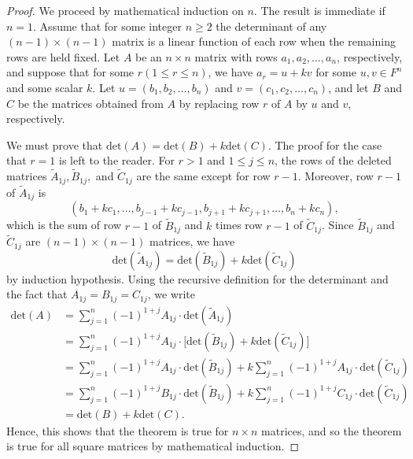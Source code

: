 \begin{proof}
We proceed by mathematical induction on \( n  \). The result is immediate if \( n = 1  \). Assume that for some integer \( n \geq 2  \) the determinant of any \( (n-1) \times (n-1) \) matrix is a linear function of each row when the remaining rows are held fixed. Let \( A  \) be an \( n \times n  \) matrix with rows \( {a}_{1}, {a}_{2}, \dots, {a}_{n} \), respectively, and suppose that for some \( r (1 \leq r \leq n) \), we have \( {a}_{r} = u + kv  \) for some \( u,v \in F^{n} \) and some scalar \( k  \). Let \( u = ({b}_{1}, {b}_{2}, \dots, {b}_{n}) \) and \( v = ({c}_{1}, {c}_{2}, \dots, {c}_{n}) \), and let \( B  \) and \( C \) be the matrices obtained from \( A  \) by replacing row \( r  \) of \( A  \) by \( u \) and \( v  \), respectively.

We must prove that \( \text{det}(A) = \text{det}(B) + k \text{det}(C) \). The proof for the case that \( r = 1  \) is left to the reader. For \( r > 1  \) and \( 1 \leq j \leq  n \), the rows of the deleted matrices \( {\tilde{A}}_{1j}, {\tilde{B}}_{1j},  \) and \( {\tilde{C}}_{1j} \) are the same except for row \( r - 1  \). Moreover, row \( r - 1  \) of \( {\tilde{A}}_{1j}  \) is 
\[ ({b}_{1} + {kc}_{1}, \dots, {b}_{j-1} + {kc}_{j-1}, {b}_{j+1} + {kc}_{j+1}, \dots, {b}_{n} + {kc}_{n}), \]
which is the sum of row \( r - 1  \) of \( {\tilde{B}}_{1j} \) and \( k  \) times row \( r -1  \) of \( {\tilde{C}}_{1j} \). Since \( {\tilde{B}}_{1j} \) and \( {\tilde{C}}_{1j} \) are \( (n-1) \times (n-1) \) matrices, we have
\[  \text{det}({\tilde{A}}_{1j}) = \text{det}({\tilde{B}}_{1j}) + k \text{det}({\tilde{C}}_{1j}) \]
by induction hypothesis. Using the recursive definition for the determinant and the fact that \( {A}_{1j} = {B}_{1j} = {C}_{1j} \), we write
\begin{align*}
    \text{det}(A) & = \sum_{ j=1 }^{ n } (-1)^{1 +j} {A}_{1j} \cdot \text{det}({\tilde{A}}_{1j}) \\
                  &= \sum_{ j=1 }^{ n } (-1)^{1+j} {A}_{1j} \cdot \Big[ \text{det}({\tilde{B}}_{1j}) + k \text{det}({\tilde{C}}_{1j}) \Big] \\
                  &= \sum_{ j=1 }^{ n } (-1)^{1+j} {A}_{1j} \cdot \text{det}({\tilde{B}}_{1j}) + k \sum_{ j=1 }^{ n } (-1)^{1+j} {A}_{1j} \cdot \text{det}({\tilde{C}}_{1j})\\
                  &= \sum_{ j=1 }^{ n } (-1)^{1+j} {B}_{1j} \cdot \text{det}({\tilde{B}}_{1j}) + k \sum_{ j=1 }^{ n } (-1)^{1+j} {C}_{1j} \cdot \text{det}({\tilde{C}}_{1j})\\
                  &= \text{det}(B) + k \text{det}(C).
\end{align*}
Hence, this shows that the theorem is true for \( n \times n  \) matrices, and so the theorem is true for all square matrices by mathematical induction. 
\end{proof}

